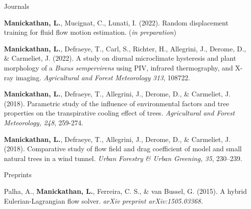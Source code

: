 \documentclass[11pt, a4paper]{preamble/awesome-cv-novo}
\begin{document}
\newpage


\begin{cventries}

  \cvpubentry
  {Journals} %
  {
    \begin{cvitems}
      \item {\textbf{Manickathan, L.}, Mucignat, C., Lunati, I. (2022). Random displacement training for fluid flow 
             motion estimation. {\bodyfontlight(\textit{in preparation})}}
      \item {\textbf{Manickathan, L.}, Defraeye, T., Carl, S., Richter, H., Allegrini, J., Derome, D., \& Carmeliet,
             J. (2022). A study on diurnal microclimate hysteresis and plant morphology of a \textit{Buxus 
             sempervirens} using PIV, infrared thermography, and X-ray imaging. {\bodyfontlight\textit{Agricultural
             and Forest Meteorology 313}, 108722.}}
      \item {\textbf{Manickathan, L.}, Defraeye, T., Allegrini, J., Derome, D., \& Carmeliet, J. (2018). Parametric 
             study of the influence of environmental factors and tree properties on the transpirative cooling 
             effect of trees. {\bodyfontlight\textit{Agricultural and Forest Meteorology, 248}, 259-274.}}
      \item {\textbf{Manickathan, L.}, Defraeye, T., Allegrini, J., Derome, D., \& Carmeliet, J. (2018). 
             Comparative study of flow field and drag coefficient of model and small natural trees in a wind tunnel.
             {\bodyfontlight\textit{Urban Forestry \& Urban Greening, 35}, 230–239.}}
    \end{cvitems}
  }

  \cvpubentry
  {Preprints}
  {
    \begin{cvitems}
      \item {Palha, A., \textbf{Manickathan, L.}, Ferreira, C. S., \& van Bussel, G. (2015). A hybrid 
             Eulerian-Lagrangian flow solver. {\bodyfontlight\textit{arXiv preprint arXiv:1505.03368.}}}
    \end{cvitems}
  }


\end{cventries}
\end{document}
